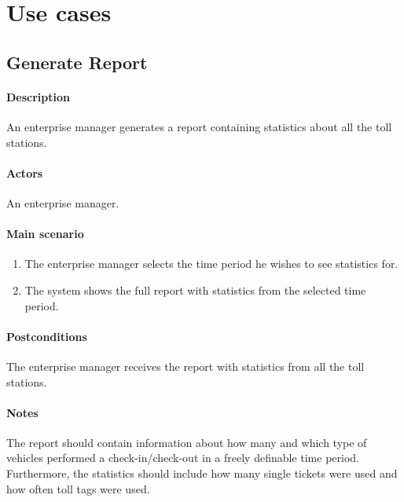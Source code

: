 \documentclass{report}
\begin{document}
\section{Use cases}
\subsection{Generate Report}
\paragraph{Description}
An enterprise manager generates a report containing statistics about all the toll stations.
\paragraph{Actors}
An enterprise manager.
\paragraph{Main scenario}
\begin{enumerate}
\item The enterprise manager selects the time period he wishes to see statistics for.
\item The system shows the full report with statistics from the selected time period.
\end{enumerate}
\paragraph{Postconditions}
The enterprise manager receives the report with statistics from all the toll stations.
\paragraph{Notes}
The report should contain information about how many and which type of vehicles performed a check-in/check-out in a freely definable time period. Furthermore, the statistics should include how many single tickets were
used and how often toll tags were used.
\end{document}
